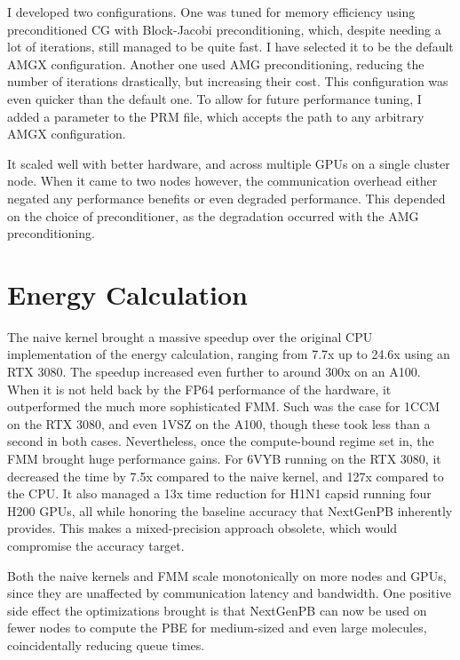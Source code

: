 I developed two configurations. 
One was tuned for memory efficiency using preconditioned CG with Block-Jacobi preconditioning, which, despite needing a lot of iterations, still managed to be quite fast.
I have selected it to be the default AMGX configuration.
Another one used AMG preconditioning, reducing the number of iterations drastically, but increasing their cost.
This configuration was even quicker than the default one.
To allow for future performance tuning, I added a  parameter to the PRM file, which accepts the path to any arbitrary AMGX configuration.

It scaled well with better hardware, and across multiple GPUs on a single cluster node.
When it came to two nodes however, the communication overhead either negated any performance benefits or even degraded performance.
This depended on the choice of preconditioner, as the degradation occurred with the AMG preconditioning.

\section{Energy Calculation}
\label{sec:conclusion-energy-calculation}

The naive kernel brought a massive speedup over the original CPU implementation of the energy calculation, ranging from 7.7x up to 24.6x using an RTX 3080.
The speedup increased even further to around 300x on an A100.
When it is not held back by the FP64 performance of the hardware, it outperformed the much more sophisticated FMM.
Such was the case for 1CCM on the RTX 3080, and even 1VSZ on the A100, though these took less than a second in both cases.
Nevertheless, once the compute-bound regime set in, the FMM brought huge performance gains.
For 6VYB running on the RTX 3080, it decreased the time by 7.5x compared to the naive kernel, and 127x compared to the CPU.
It also managed a 13x time reduction for H1N1 capsid running four H200 GPUs, all while honoring the baseline accuracy that NextGenPB inherently provides.
This makes a mixed-precision approach obsolete, which would compromise the accuracy target.

Both the naive kernels and FMM scale monotonically on more nodes and GPUs, since they are unaffected by communication latency and bandwidth.
One positive side effect the optimizations brought is that NextGenPB can now be used on fewer nodes to compute the PBE for medium-sized and even large molecules, coincidentally reducing queue times.

